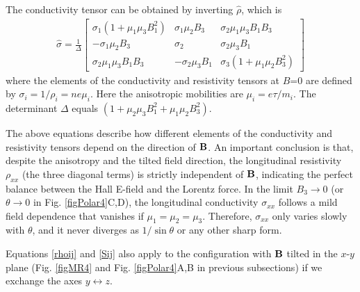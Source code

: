 The conductivity tensor can be obtained by inverting $\hat\rho$, which is 
\begin{eqnarray}
\hat{\sigma} = 
						\frac{1}{\Delta}\left[  	\begin{array}{ccc}
								\sigma_1(1+\mu_1\mu_3 B_1^2)  &  \sigma_1\mu_2B_3   &   \sigma_2\mu_1\mu_3 B_1B_3 \\
								 -\sigma_1\mu_2B_3									&   \sigma_2   									&   \sigma_2\mu_3B_1   \\
								\sigma_2\mu_1\mu_3 B_1B_3     &    -\sigma_2\mu_3B_1      &   \sigma_3(1+\mu_1\mu_2B_3^2)
								\end{array}
								\right]
				\label{Sij}
				\end{eqnarray}
where the elements of the conductivity and resistivity tensors at $B$=0 are defined by $\sigma_i = 1/\rho_i = ne\mu_i $. Here the anisotropic
mobilities are $\mu_i = e\tau/m_i$. The determinant $\Delta$ equals $(1+\mu_2\mu_3 B_1^2+ \mu_1\mu_2 B_3^2)$.

The above equations describe how different elements of the conductivity and resistivity tensors depend on the direction of $\bf B$. An important conclusion is that, despite the anisotropy and the tilted field direction, the longitudinal resistivity 
$\rho_{xx}$ (the three diagonal terms) is strictly independent of $\bf B$, indicating the perfect balance between the Hall E-field and the Lorentz force. In the limit $B_3\to 0$ (or $\theta\to 0$ in Fig. \ref{figPolar4}C,D), the longitudinal conductivity $\sigma_{xx}$ follows a mild field dependence that vanishes if $\mu_1 = \mu_2 = \mu_3$. Therefore, $\sigma_{xx}$ only varies slowly with $\theta$, and it never diverges as $1/\sin\theta$ or any other sharp form.

Equations \ref{rhoij} and \ref{Sij} also apply to the configuration with $\bf B$ tilted in the $x$-$y$ plane (Fig. \ref{figMR4} and Fig. \ref{figPolar4}A,B in previous subsections) if we exchange the axes $y\leftrightarrow z$.


